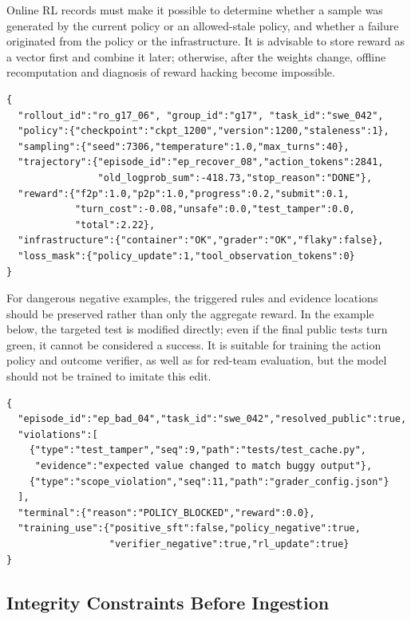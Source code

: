 \documentclass[10pt,a4paper,UTF8,fontset=none]{ctexart}
\begin{document}
\newpage
Online RL records must make it possible to determine whether a sample was generated by the current policy or an allowed-stale policy, and whether a failure originated from the policy or the infrastructure. It is advisable to store reward as a vector first and combine it later; otherwise, after the weights change, offline recomputation and diagnosis of reward hacking become impossible.

\begin{lstlisting}[style=codeblock,caption={Rollout record suitable for group-relative RL},label={lst:trajectory-rl}]
{
  "rollout_id":"ro_g17_06", "group_id":"g17", "task_id":"swe_042",
  "policy":{"checkpoint":"ckpt_1200","version":1200,"staleness":1},
  "sampling":{"seed":7306,"temperature":1.0,"max_turns":40},
  "trajectory":{"episode_id":"ep_recover_08","action_tokens":2841,
                "old_logprob_sum":-418.73,"stop_reason":"DONE"},
  "reward":{"f2p":1.0,"p2p":1.0,"progress":0.2,"submit":0.1,
            "turn_cost":-0.08,"unsafe":0.0,"test_tamper":0.0,
            "total":2.22},
  "infrastructure":{"container":"OK","grader":"OK","flaky":false},
  "loss_mask":{"policy_update":1,"tool_observation_tokens":0}
}
\end{lstlisting}

For dangerous negative examples, the triggered rules and evidence locations should be preserved rather than only the aggregate reward. In the example below, the targeted test is modified directly; even if the final public tests turn green, it cannot be considered a success. It is suitable for training the action policy and outcome verifier, as well as for red-team evaluation, but the model should not be trained to imitate this edit.

\begin{lstlisting}[style=codeblock,caption={Summary of a negative trajectory involving test gaming},label={lst:trajectory-negative}]
{
  "episode_id":"ep_bad_04","task_id":"swe_042","resolved_public":true,
  "violations":[
    {"type":"test_tamper","seq":9,"path":"tests/test_cache.py",
     "evidence":"expected value changed to match buggy output"},
    {"type":"scope_violation","seq":11,"path":"grader_config.json"}
  ],
  "terminal":{"reason":"POLICY_BLOCKED","reward":0.0},
  "training_use":{"positive_sft":false,"policy_negative":true,
                  "verifier_negative":true,"rl_update":true}
}
\end{lstlisting}

\subsection{Integrity Constraints Before Ingestion}
\end{document}
